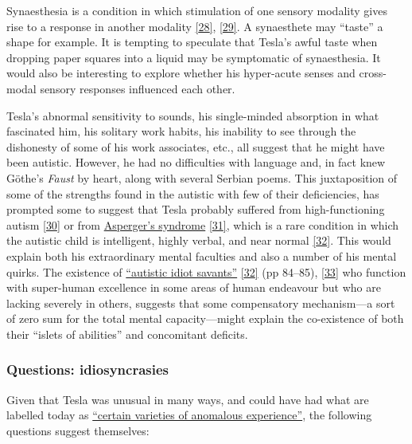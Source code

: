 \documentclass[
  12pt,
  british,
  a4paper,
  rgb,
  dvipsnames,
  svgnames,
  hyphens]{article}
\begin{document}
Synaesthesia is a condition in which stimulation of one sensory modality
gives rise to a response in another modality
\protect\hyperlink{ref-marks00}{{[}28{]}},
\protect\hyperlink{ref-cytowic96}{{[}29{]}}. A synaesthete may ``taste''
a shape for example. It is tempting to speculate that Tesla's awful
taste when dropping paper squares into a liquid may be symptomatic of
synaesthesia. It would also be interesting to explore whether his
hyper-acute senses and cross-modal sensory responses influenced each
other.

Tesla's abnormal sensitivity to sounds, his single-minded absorption in
what fascinated him, his solitary work habits, his inability to see
through the dishonesty of some of his work associates, etc., all suggest
that he might have been autistic. However, he had no difficulties with
language and, in fact knew Göthe's \emph{Faust} by heart, along with
several Serbian poems. This juxtaposition of some of the strengths found
in the autistic with few of their deficiencies, has prompted some to
suggest that Tesla probably suffered from high-functioning autism
\protect\hyperlink{ref-blume04}{{[}30{]}} or from
\href{https://en.wikipedia.org/wiki/Asperger_syndrome}{Asperger's
syndrome} \protect\hyperlink{ref-tesla-faq}{{[}31{]}}, which is a rare
condition in which the autistic child is intelligent, highly verbal, and
near normal \protect\hyperlink{ref-frith90}{{[}32{]}}. This would
explain both his extraordinary mental faculties and also a number of his
mental quirks. The existence of
\href{https://en.wikipedia.org/wiki/Savant_syndrome}{``autistic idiot
savants''} \protect\hyperlink{ref-frith90}{{[}32{]}} (pp 84--85),
\protect\hyperlink{ref-savant2009}{{[}33{]}} who function with
super-human excellence in some areas of human endeavour but who are
lacking severely in others, suggests that some compensatory
mechanism---a sort of zero sum for the total mental capacity---might
explain the co-existence of both their ``islets of abilities'' and
concomitant deficits.

\hypertarget{questions-idiosyncrasies}{%
\subsubsection{Questions:
idiosyncrasies}\label{questions-idiosyncrasies}}

Given that Tesla was unusual in many ways, and could have had what are
labelled today as
\href{https://en.wikipedia.org/wiki/Varieties_of_Anomalous_Experience}{``certain
varieties of anomalous experience''}, the following questions suggest
themselves:
\end{document}
